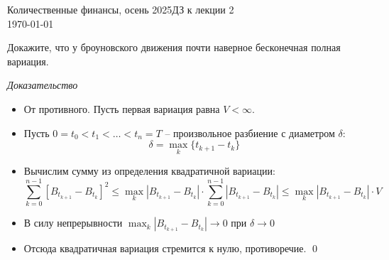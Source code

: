 \documentclass[12pt]{article}
\begin{document}
\noindent Количественные финансы, осень 2025\hfill ДЗ к лекции 2\\
\today

\hrulefill

\begin{problem}
    Докажите, что у броуновского движения почти наверное бесконечная полная вариация.
\end{problem}

\textit{Доказательство}
\begin{itemize}
    \item От противного. Пусть первая вариация равна $V < \infty$.
    \item Пусть $0 = t_0 < t_1 < \ldots < t_n = T$ -- произвольное разбиение с диаметром $\delta$: 
        $$\delta = \max_k \{t_{k+1} - t_k\}$$ 
    \item Вычислим сумму из определения квадратичной вариации: $$
        \sum_{k=0}^{n-1} \left[B_{t_{k+1}} - B_{t_k}\right]^2 \leq 
        \max_{k} |B_{t_{k+1}} - B_{t_k}| \cdot \sum_{k=0}^{n-1} |B_{t_{k+1}} - B_{t_k}|
        \leq \max_{k} |B_{t_{k+1}} - B_{t_k}| \cdot V
    $$
    \item В силу непрерывности $\max_{k} |B_{t_{k+1}} - B_{t_k}|\to 0$ при $\delta \to 0$
    \item Отсюда квадратичная вариация стремится к нулю, противоречие. \qed
\end{itemize}
 
\end{document}
